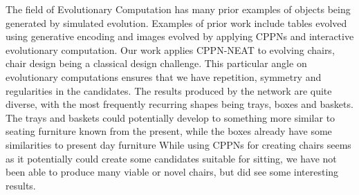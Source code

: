 The field of Evolutionary Computation has many prior examples of objects being
generated by simulated evolution.
Examples of prior work include tables evolved using generative encoding
and images evolved by applying CPPNs and interactive evolutionary computation.
Our work applies CPPN-NEAT to evolving chairs, chair design being a
classical design challenge. This particular angle on evolutionary computations
ensures that we have repetition, symmetry and regularities in the candidates.
The results produced by the network are quite diverse, with the most frequently
recurring shapes being trays, boxes and baskets. The trays and baskets could
potentially develop to something more similar to seating furniture known from
the present, while the boxes already have some similarities to present day
furniture While using CPPNs for creating chairs seems as it potentially could
create some candidates suitable for sitting, we have not been able to produce
many viable or novel chairs, but did see some interesting results.
